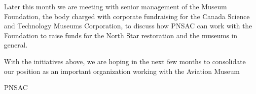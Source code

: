 Later this month we are meeting with senior management of the Museum
Foundation, the body charged with corporate fundraising for the Canada
Science and Technology Museums Corporation, to discuss how PNSAC can
work with the Foundation to raise funds for the North Star restoration
and the museums in general.

With the initiatives above, we are hoping in the next few months to
consolidate our position as an important organization working with the
Aviation Museum


\begin{footnotesize}
    \raggedleft PNSAC\\
\end{footnotesize}



